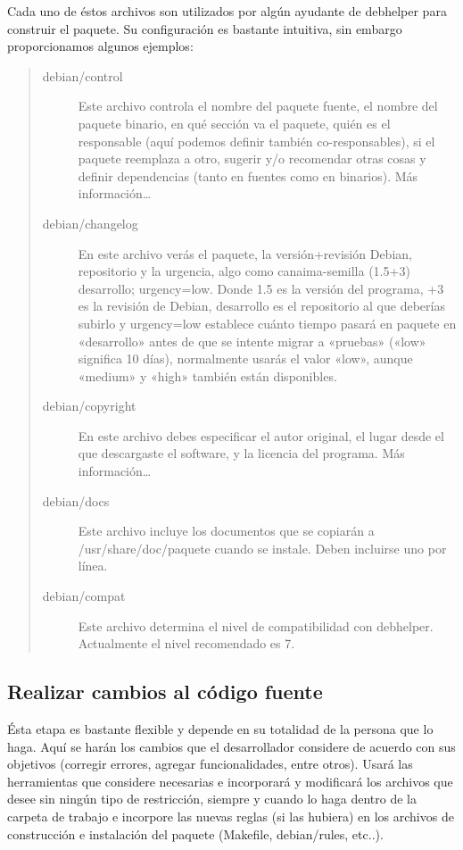 \documentclass[letterpaper,12pt,spanish]{manual}
\begin{document}
Cada uno de éstos archivos son utilizados por algún ayudante de debhelper para construir el paquete. Su configuración es bastante intuitiva, sin embargo proporcionamos algunos ejemplos:
\begin{quote}\begin{description}
\item[{debian/control}] \leavevmode
Este archivo controla el nombre del paquete fuente, el nombre del paquete binario, en qué sección va el paquete, quién es el responsable (aquí podemos definir también co-responsables), si el paquete reemplaza a otro, sugerir y/o recomendar otras cosas y definir dependencias (tanto en fuentes como en binarios). Más información…

\item[{debian/changelog}] \leavevmode
En este archivo verás el paquete, la versión+revisión Debian, repositorio y la urgencia, algo como canaima-semilla (1.5+3) desarrollo; urgency=low. Donde 1.5 es la versión del programa, +3 es la revisión de Debian, desarrollo es el repositorio al que deberías subirlo y urgency=low establece cuánto tiempo pasará en paquete en «desarrollo» antes de que se intente migrar a «pruebas» («low» significa 10 días), normalmente usarás el valor «low», aunque «medium» y «high» también están disponibles.

\item[{debian/copyright}] \leavevmode
En este archivo debes especificar el autor original, el lugar desde el que descargaste el software, y la licencia del programa. Más información…

\item[{debian/docs}] \leavevmode
Este archivo incluye los documentos que se copiarán a /usr/share/doc/paquete cuando se instale. Deben incluirse uno por línea.

\item[{debian/compat}] \leavevmode
Este archivo determina el nivel de compatibilidad con debhelper. Actualmente el nivel recomendado es 7.

\end{description}\end{quote}


\subsection{Realizar cambios al código fuente}

Ésta etapa es bastante flexible y depende en su totalidad de la persona que lo haga. Aquí se harán los cambios que el desarrollador considere de acuerdo con sus objetivos (corregir errores, agregar funcionalidades, entre otros). Usará las herramientas que considere necesarias e incorporará y modificará los archivos que desee sin ningún tipo de restricción, siempre y cuando lo haga dentro de la carpeta de trabajo e incorpore las nuevas reglas (si las hubiera) en los archivos de construcción e instalación del paquete (Makefile, debian/rules, etc..).
\end{document}
